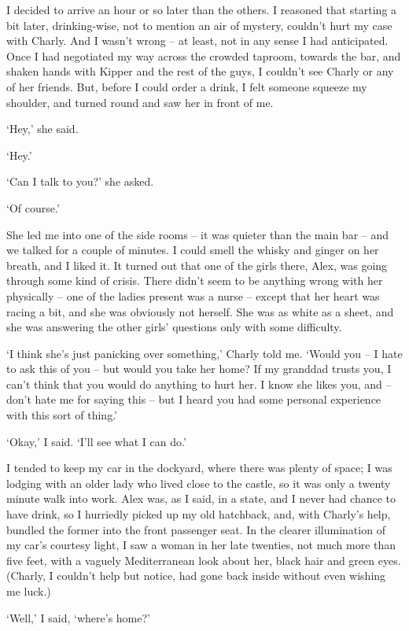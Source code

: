 I decided to arrive an hour or so later than the others. I reasoned that starting a bit later, drinking-wise, not to mention an air of mystery, couldn't hurt my case with Charly. And I wasn't wrong -- at least, not in any sense I had anticipated. Once I had negotiated my way across the crowded taproom, towards the bar, and shaken hands with Kipper and the rest of the guys, I couldn't see Charly or any of her friends. But, before I could order a drink, I felt someone squeeze my shoulder, and turned round and saw her in front of me.

`Hey,' she said.

`Hey.'

`Can I talk to you?' she asked.

`Of course.'

She led me into one of the side rooms -- it was quieter than the main bar -- and we talked for a couple of minutes. I could smell the whisky and ginger on her breath, and I liked it. It turned out that one of the girls there, Alex, was going through some kind of crisis. There didn't seem to be anything wrong with her physically -- one of the ladies present was a nurse -- except that her heart was racing a bit, and she was obviously not herself. She was as white as a sheet, and she was answering the other girls' questions only with some difficulty.

`I think she's just panicking over something,' Charly told me. `Would you -- I hate to ask this of you -- but would you take her home? If my granddad trusts you, I can't think that you would do anything to hurt her. I know she likes you, and -- don't hate me for saying this -- but I heard you had some personal experience with this sort of thing.'

`Okay,' I said. `I'll see what I can do.'

I tended to keep my car in the dockyard, where there was plenty of space; I was lodging with an older lady who lived close to the castle, so it was only a twenty minute walk into work. Alex was, as I said, in a state, and I never had chance to have drink, so I hurriedly picked up my old hatchback, and, with Charly's help, bundled the former into the front passenger seat. In the clearer illumination of my car's courtesy light, I saw a woman in her late twenties, not much more than five feet, with a vaguely Mediterranean look about her, black hair and green eyes. (Charly, I couldn't help but notice, had gone back inside without even wishing me luck.)

`Well,' I said, `where's home?'

